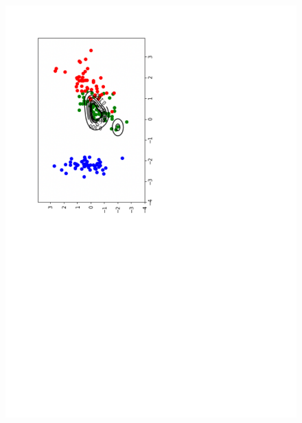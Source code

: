 \documentclass [11pt,a4paper,twoside,openright] {book}
\begin{document}
\begin{figure}[!tb]
          {\includegraphics[scale=.35]{figure/wirnversicolor.pdf}}\qquad\qquad
           \subfigure[virginica]%

\end{figure}
\end{document}
